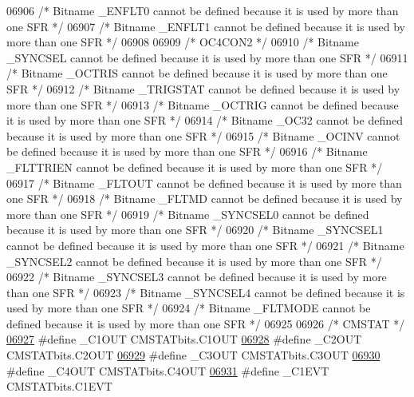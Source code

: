 \begin{DoxyCode}
06906 \textcolor{comment}{/* Bitname \_ENFLT0 cannot be defined because it is used by more than one SFR */}
06907 \textcolor{comment}{/* Bitname \_ENFLT1 cannot be defined because it is used by more than one SFR */}
06908 
06909 \textcolor{comment}{/* OC4CON2 */}
06910 \textcolor{comment}{/* Bitname \_SYNCSEL cannot be defined because it is used by more than one SFR */}
06911 \textcolor{comment}{/* Bitname \_OCTRIS cannot be defined because it is used by more than one SFR */}
06912 \textcolor{comment}{/* Bitname \_TRIGSTAT cannot be defined because it is used by more than one SFR */}
06913 \textcolor{comment}{/* Bitname \_OCTRIG cannot be defined because it is used by more than one SFR */}
06914 \textcolor{comment}{/* Bitname \_OC32 cannot be defined because it is used by more than one SFR */}
06915 \textcolor{comment}{/* Bitname \_OCINV cannot be defined because it is used by more than one SFR */}
06916 \textcolor{comment}{/* Bitname \_FLTTRIEN cannot be defined because it is used by more than one SFR */}
06917 \textcolor{comment}{/* Bitname \_FLTOUT cannot be defined because it is used by more than one SFR */}
06918 \textcolor{comment}{/* Bitname \_FLTMD cannot be defined because it is used by more than one SFR */}
06919 \textcolor{comment}{/* Bitname \_SYNCSEL0 cannot be defined because it is used by more than one SFR */}
06920 \textcolor{comment}{/* Bitname \_SYNCSEL1 cannot be defined because it is used by more than one SFR */}
06921 \textcolor{comment}{/* Bitname \_SYNCSEL2 cannot be defined because it is used by more than one SFR */}
06922 \textcolor{comment}{/* Bitname \_SYNCSEL3 cannot be defined because it is used by more than one SFR */}
06923 \textcolor{comment}{/* Bitname \_SYNCSEL4 cannot be defined because it is used by more than one SFR */}
06924 \textcolor{comment}{/* Bitname \_FLTMODE cannot be defined because it is used by more than one SFR */}
06925 
06926 \textcolor{comment}{/* CMSTAT */}
\hypertarget{a00015_source_l06927}{}\hyperlink{a00015_a893a2b1d497d00713d200f81140cb9e7}{06927} \textcolor{preprocessor}{#define \_C1OUT CMSTATbits.C1OUT}
\hypertarget{a00015_source_l06928}{}\hyperlink{a00015_a479960c791e0c717b96b8790c86e8175}{06928} \textcolor{preprocessor}{#define \_C2OUT CMSTATbits.C2OUT}
\hypertarget{a00015_source_l06929}{}\hyperlink{a00015_afc99a9f1bc70de44616dee28db12fb2f}{06929} \textcolor{preprocessor}{#define \_C3OUT CMSTATbits.C3OUT}
\hypertarget{a00015_source_l06930}{}\hyperlink{a00015_a76939cbe9a8a057226c8819155e969c5}{06930} \textcolor{preprocessor}{#define \_C4OUT CMSTATbits.C4OUT}
\hypertarget{a00015_source_l06931}{}\hyperlink{a00015_a6742f041dbe63a1670686391810bb50e}{06931} \textcolor{preprocessor}{#define \_C1EVT CMSTATbits.C1EVT}

\end{DoxyCode}
